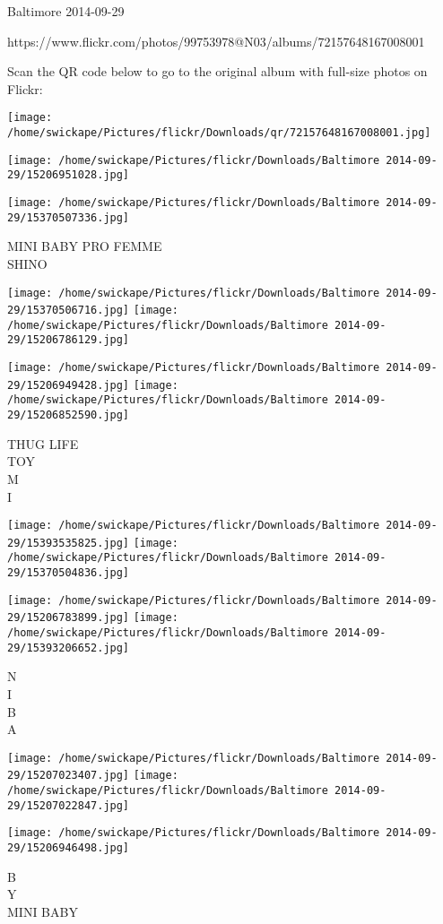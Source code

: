 \documentclass[10pt,letterpaper]{article}
\begin{document}
Baltimore 2014-09-29

https://www.flickr.com/photos/99753978@N03/albums/72157648167008001

Scan the QR code below to go to the original album with full-size photos on Flickr:

\texttt{[image: /home/swickape/Pictures/flickr/Downloads/qr/72157648167008001.jpg]}
\pagebreak

\texttt{[image: /home/swickape/Pictures/flickr/Downloads/Baltimore 2014-09-29/15206951028.jpg]}

\vspace{0.25in}
\texttt{[image: /home/swickape/Pictures/flickr/Downloads/Baltimore 2014-09-29/15370507336.jpg]}

MINI BABY PRO FEMME\\
SHINO
\pagebreak

\texttt{[image: /home/swickape/Pictures/flickr/Downloads/Baltimore 2014-09-29/15370506716.jpg]}
\texttt{[image: /home/swickape/Pictures/flickr/Downloads/Baltimore 2014-09-29/15206786129.jpg]}

\texttt{[image: /home/swickape/Pictures/flickr/Downloads/Baltimore 2014-09-29/15206949428.jpg]}
\texttt{[image: /home/swickape/Pictures/flickr/Downloads/Baltimore 2014-09-29/15206852590.jpg]}

THUG LIFE\\
TOY\\
M\\
I
\pagebreak

\texttt{[image: /home/swickape/Pictures/flickr/Downloads/Baltimore 2014-09-29/15393535825.jpg]}
\texttt{[image: /home/swickape/Pictures/flickr/Downloads/Baltimore 2014-09-29/15370504836.jpg]}

\texttt{[image: /home/swickape/Pictures/flickr/Downloads/Baltimore 2014-09-29/15206783899.jpg]}
\texttt{[image: /home/swickape/Pictures/flickr/Downloads/Baltimore 2014-09-29/15393206652.jpg]}

N\\
I\\
B\\
A
\pagebreak

\texttt{[image: /home/swickape/Pictures/flickr/Downloads/Baltimore 2014-09-29/15207023407.jpg]}
\texttt{[image: /home/swickape/Pictures/flickr/Downloads/Baltimore 2014-09-29/15207022847.jpg]}

\vspace{0.25in}
\texttt{[image: /home/swickape/Pictures/flickr/Downloads/Baltimore 2014-09-29/15206946498.jpg]}

B\\
Y\\
MINI BABY
\pagebreak
\end{document}
